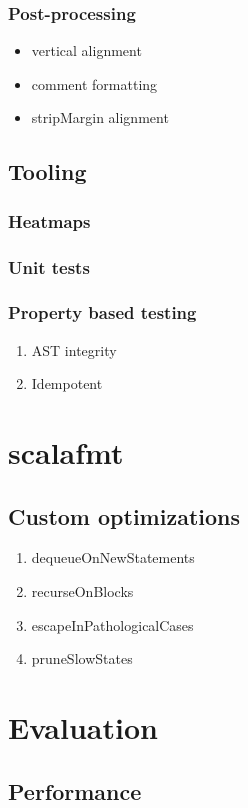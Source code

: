 \documentclass[11pt,a4paper]{article}
\begin{document}
\subsubsection{Post-processing}
\begin{itemize}
  \item vertical alignment
  \item comment formatting
  \item stripMargin alignment
\end{itemize}
\subsection{Tooling}
\subsubsection{Heatmaps}
\subsubsection{Unit tests}
\subsubsection{Property based testing}
\begin{enumerate}
  \item AST integrity
  \item Idempotent
\end{enumerate}
\section{scalafmt}
\subsection{Custom optimizations}
\begin{enumerate}
  \item dequeueOnNewStatements
  \item recurseOnBlocks
  \item escapeInPathologicalCases
  \item pruneSlowStates
\end{enumerate}
\section{Evaluation}
\subsection{Performance}
\end{document}
